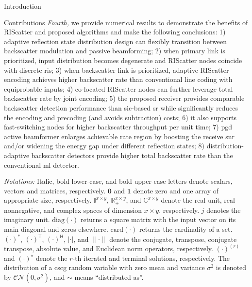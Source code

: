 \documentclass[journal]{IEEEtran}
\begin{document}
\begin{section}{Introduction}
\begin{subsection}{Contributions}
		\emph{Fourth,} we provide numerical results to demonstrate the benefits of RIScatter and proposed algorithms and make the following conclusions:
		1) adaptive reflection state distribution design can flexibly transition between backscatter modulation and passive beamforming;
		2) when primary link is prioritized, input distribution becomes degenerate and RIScatter nodes coincide with discrete \gls{ris};
		3) when backscatter link is prioritized, adaptive RIScatter encoding achieves higher backscatter rate than conventional line coding with equiprobable inputs;
		4) co-located RIScatter nodes can further leverage total backscatter rate by joint encoding;
		5) the proposed receiver provides comparable backscatter detection performance than \gls{sic}-based \gls{sr} while significantly reduces the encoding and precoding (and avoids subtraction) costs;
		6) it also supports fast-switching nodes for higher backscatter throughput per unit time;
		7) \gls{pgd} active beamformer enlarges achievable rate region by boosting the receive \gls{snr} and/or widening the energy gap under different reflection states;
		8) distribution-adaptive backscatter detectors provide higher total backscatter rate than the conventional \gls{ml} detector.
	\end{subsection}

	\emph{Notations:}
	Italic, bold lower-case, and bold upper-case letters denote scalars, vectors and matrices, respectively.
	$\boldsymbol{0}$ and $\boldsymbol{1}$ denote zero and one array of appropriate size, respectively. $\mathbb{I}^{x \times y}$, $\mathbb{R}_+^{x \times y}$, and $\mathbb{C}^{x \times y}$ denote the real unit, real nonnegative, and complex spaces of dimension $x \times y$, respectively.
	$j$ denotes the imaginary unit.
	$\mathrm{diag}(\cdot)$ returns a square matrix with the input vector on its main diagonal and zeros elsewhere.
	$\mathrm{card}(\cdot)$ returns the cardinality of a set.
	$(\cdot)^*$, $(\cdot)^\mathsf{T}$, $(\cdot)^\mathsf{H}$, $\lvert{\cdot}\rvert$, and $\lVert{\cdot}\rVert$ denote the conjugate, transpose, conjugate transpose, absolute value, and Euclidean norm operators, respectively.
	$(\cdot)^{(r)}$ and $(\cdot)^{\star}$ denote the $r$-th iterated and terminal solutions, respectively.
	The distribution of a \gls{cscg} random variable with zero mean and variance $\sigma^2$ is denoted by $\mathcal{CN}(0,\sigma^2)$, and $\sim$ means ``distributed as''.
\end{section}
\end{document}
